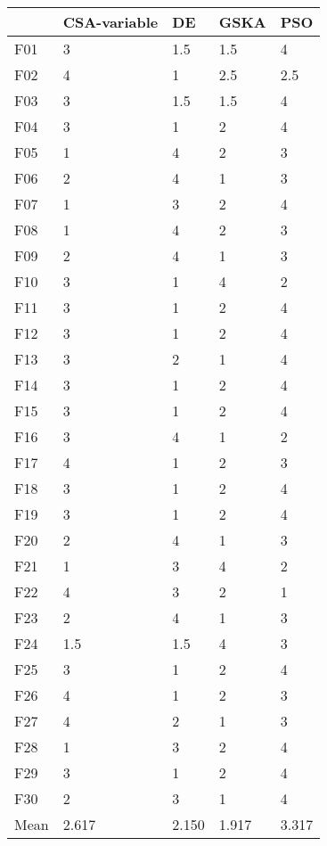 \begin{tabular}{lllll}
\toprule
{} & CSA-variable &     DE &   GSKA &    PSO \\
\midrule
F01  &            3 &    1.5 &    1.5 &      4 \\
F02  &            4 &      1 &    2.5 &    2.5 \\
F03  &            3 &    1.5 &    1.5 &      4 \\
F04  &            3 &      1 &      2 &      4 \\
F05  &            1 &      4 &      2 &      3 \\
F06  &            2 &      4 &      1 &      3 \\
F07  &            1 &      3 &      2 &      4 \\
F08  &            1 &      4 &      2 &      3 \\
F09  &            2 &      4 &      1 &      3 \\
F10  &            3 &      1 &      4 &      2 \\
F11  &            3 &      1 &      2 &      4 \\
F12  &            3 &      1 &      2 &      4 \\
F13  &            3 &      2 &      1 &      4 \\
F14  &            3 &      1 &      2 &      4 \\
F15  &            3 &      1 &      2 &      4 \\
F16  &            3 &      4 &      1 &      2 \\
F17  &            4 &      1 &      2 &      3 \\
F18  &            3 &      1 &      2 &      4 \\
F19  &            3 &      1 &      2 &      4 \\
F20  &            2 &      4 &      1 &      3 \\
F21  &            1 &      3 &      4 &      2 \\
F22  &            4 &      3 &      2 &      1 \\
F23  &            2 &      4 &      1 &      3 \\
F24  &          1.5 &    1.5 &      4 &      3 \\
F25  &            3 &      1 &      2 &      4 \\
F26  &            4 &      1 &      2 &      3 \\
F27  &            4 &      2 &      1 &      3 \\
F28  &            1 &      3 &      2 &      4 \\
F29  &            3 &      1 &      2 &      4 \\
F30  &            2 &      3 &      1 &      4 \\
Mean &        2.617 &  2.150 &  1.917 &  3.317 \\
\bottomrule
\end{tabular}
